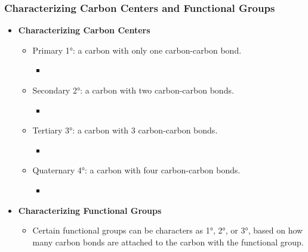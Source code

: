 \documentclass[12pt,a4paper]{article}
\begin{document}
\begin{itemize}
    \subsubsection{Characterizing Carbon Centers and Functional Groups}
    \begin{itemize}
        \item \textbf{Characterizing Carbon Centers}
            \begin{itemize}
                \item Primary \ang{1}: a carbon with only one carbon-carbon bond.
                    \begin{itemize}
                        \item {}\hspace{12pt}
                    \end{itemize}
                \item Secondary \ang{2}: a carbon with two carbon-carbon bonds.
                    \begin{itemize}
                        \item {}\hspace{12pt}
                    \end{itemize}
                \item Tertiary  \ang{3}: a carbon with 3 carbon-carbon bonds.
                    \begin{itemize}
                        \item {}\hspace{12pt}
                    \end{itemize}
                \item Quaternary \ang{4}: a carbon with four carbon-carbon bonds.
                    \begin{itemize}
                        \item {}\hspace{12pt}
                    \end{itemize}
            \end{itemize}
        \item \textbf{Characterizing Functional Groups}
            \begin{itemize}
                \item Certain functional groups can be characters as \ang{1}, \ang{2}, or \ang{3}, based on how many carbon bonds are attached to the carbon with the functional group.
            \end{itemize}
    \end{itemize}
\end{itemize}
\end{document}
